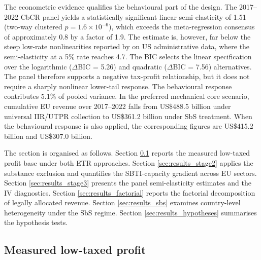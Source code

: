 \documentclass[11pt,a4paper]{article}
\begin{document}
The econometric evidence qualifies the behavioural part of the design. The 2017--2022 CbCR panel yields a statistically significant linear semi-elasticity of 1.51 (two-way clustered $p = 1.6 \times 10^{-6}$), which exceeds the meta-regression consensus of approximately 0.8 \citep{heckemeyer2017} by a factor of 1.9. The estimate is, however, far below the steep low-rate nonlinearities reported by \citet{dowd2017} on US administrative data, where the semi-elasticity at a 5\% rate reaches 4.7. The BIC selects the linear specification over the logarithmic ($\Delta$BIC = 5.26) and quadratic ($\Delta$BIC = 7.56) alternatives. The panel therefore supports a negative tax-profit relationship, but it does not require a sharply nonlinear lower-tail response. The behavioural response contributes 5.1\% of pooled variance. In the preferred mechanical core scenario, cumulative EU revenue over 2017--2022 falls from US\$488.5 billion under universal IIR/UTPR collection to US\$361.2 billion under SbS treatment. When the behavioural response is also applied, the corresponding figures are US\$415.2 billion and US\$307.0 billion.

The section is organised as follows. Section \ref{sec:results_stage1} reports the measured low-taxed profit base under both ETR approaches. Section \ref{sec:results_stage2} applies the substance exclusion and quantifies the SBTI-capacity gradient across EU sectors. Section \ref{sec:results_stage3} presents the panel semi-elasticity estimates and the IV diagnostics. Section \ref{sec:results_factorial} reports the factorial decomposition of legally allocated revenue. Section \ref{sec:results_sbs} examines country-level heterogeneity under the SbS regime. Section \ref{sec:results_hypotheses} summarises the hypothesis tests.

\subsection{Measured low-taxed profit}\label{sec:results_stage1}
\end{document}
